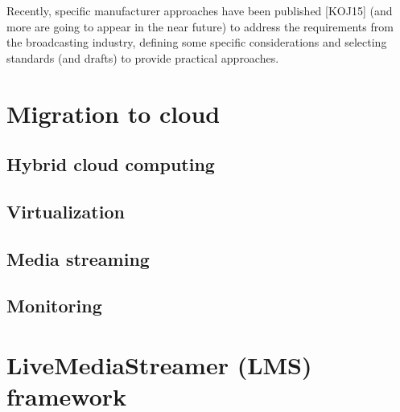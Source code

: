 Recently, specific manufacturer approaches have been published [KOJ15] (and more are going to
appear in the near future) to address the requirements from the broadcasting industry, defining some
specific considerations and selecting standards (and drafts) to provide practical approaches.


\section{Migration to cloud}

\subsection{Hybrid cloud computing}


\subsection{Virtualization}


\subsection{Media streaming}


\subsection{Monitoring}


\section{LiveMediaStreamer (LMS) framework}







